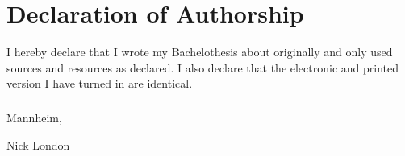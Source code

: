 \documentclass[12pt,a4paper,oneside,openright,onecolumn,titlepage]{scrbook}
\begin{document}
\chapter*{Declaration of Authorship}
I hereby declare that I wrote my Bachelothesis about \say{\thetitle} originally and only used sources and resources as declared. I also declare that the electronic and printed version I have turned in are identical.

\paragraph*{}
\vspace{.2in}
Mannheim, \makebox[1.8in]{\hrulefill}\hfill{}\makebox[2.5in]{\hrulefill}\par
\hfill{}Nick London
\end{document}
